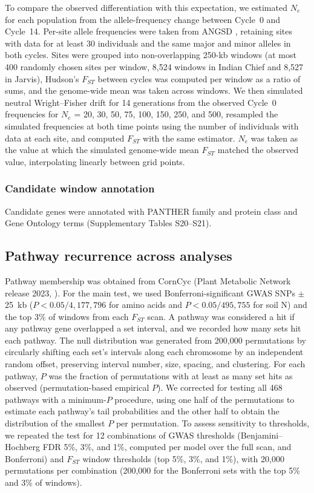 To compare the observed differentiation with this expectation, we estimated $N_e$ for each population from the allele-frequency change between Cycle~0 and Cycle~14. Per-site allele frequencies were taken from ANGSD \citep{Korneliussen2014ANGSD}, retaining sites with data for at least 30 individuals and the same major and minor alleles in both cycles. Sites were grouped into non-overlapping 250-kb windows (at most 400 randomly chosen sites per window, 8,524 windows in Indian Chief and 8,527 in Jarvis), Hudson's $F_{ST}$ \citep{Bhatia2013Fst} between cycles was computed per window as a ratio of sums, and the genome-wide mean was taken across windows. We then simulated neutral Wright--Fisher drift for 14 generations from the observed Cycle~0 frequencies for $N_e$ = 20, 30, 50, 75, 100, 150, 250, and 500, resampled the simulated frequencies at both time points using the number of individuals with data at each site, and computed $F_{ST}$ with the same estimator. $N_e$ was taken as the value at which the simulated genome-wide mean $F_{ST}$ matched the observed value, interpolating linearly between grid points.

\subsubsection{Candidate window annotation}

Candidate genes were annotated with PANTHER family and protein class \citep{Thomas2022PANTHER} and Gene Ontology terms \citep{GO2026} (Supplementary Tables S20--S21).

\subsection{Pathway recurrence across analyses}
Pathway membership was obtained from CornCyc (Plant Metabolic Network release 2023, \citealp{Hawkins2021PMN}). For the main test, we used Bonferroni-significant GWAS SNPs $\pm$25~kb ($P < 0.05/4{,}177{,}796$ for amino acids and $P < 0.05/495{,}755$ for soil N) and the top 3\% of windows from each $F_{ST}$ scan. A pathway was considered a hit if any pathway gene overlapped a set interval, and we recorded how many sets hit each pathway. The null distribution was generated from 200,000 permutations by circularly shifting each set's intervals along each chromosome by an independent random offset, preserving interval number, size, spacing, and clustering. For each pathway, $P$ was the fraction of permutations with at least as many set hits as observed (permutation-based empirical $P$). We corrected for testing all 468 pathways with a minimum-$P$ procedure, using one half of the permutations to estimate each pathway's tail probabilities and the other half to obtain the distribution of the smallest $P$ per permutation. To assess sensitivity to thresholds, we repeated the test for 12 combinations of GWAS thresholds (Benjamini--Hochberg FDR 5\%, 3\%, and 1\%, computed per model over the full scan, and Bonferroni) and $F_{ST}$ window thresholds (top 5\%, 3\%, and 1\%), with 20,000 permutations per combination (200,000 for the Bonferroni sets with the top 5\% and 3\% of windows).

